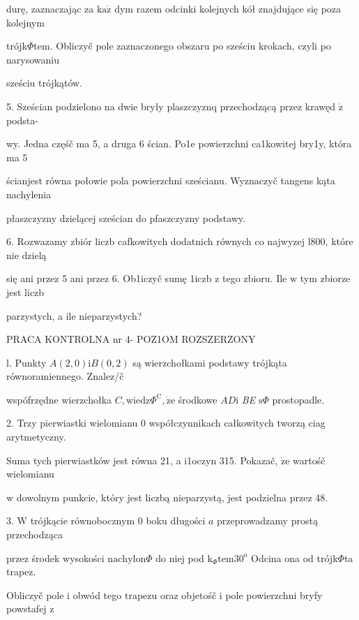 \documentclass[a4paper,12pt]{article}
\begin{document}
durę, zaznaczając za $\mathrm{k}\mathrm{a}\dot{\mathrm{z}}$ dym razem odcinki kolejnych kół znajdujące się poza kolejnym

trójk$\Phi$tem. Obliczyč pole zaznaczonego obszaru po sześciu krokach, czyli po narysowaniu

sześciu trójkątów.

5. Sześcian podzielono na dwie bryły plaszczyznq przechodzącą przez krawęd $\acute{\mathrm{z}}$ podsta-

wy. Jedna częśč ma 5, a druga 6 ścian. Po1e powierzchni ca1kowitej bry1y, która ma 5

ścianjest równa połowie pola powierzchni sześcianu. Wyznaczyč tangens kąta nachylenia

płaszczyzny dzielącej sześcian do pfaszczyzny podstawy.

6. Rozwazamy zbiór liczb cafkowitych dodatnich równych co najwyzej l800, które nie dzielą

się ani przez 5 ani przez 6. Ob1iczyč sumę 1iczb $\mathrm{z}$ tego zbioru. Ile $\mathrm{w}$ tym zbiorze jest liczb

parzystych, a ile nieparzystych?




PRACA KONTROLNA nr 4- POZ1OM ROZSZERZONY

l. Punkty $A(2,0)\mathrm{i}B(0,2)$ są wierzchołkami podstawy trójkąta równoramiennego. Znalez/č

wspófrzędne wierzchołka $C, \mathrm{w}\mathrm{i}\mathrm{e}\mathrm{d}\mathrm{z}\Phi^{\mathrm{C}}, \dot{\mathrm{z}}\mathrm{e}$ środkowe $AD\mathrm{i}$ {\it BE} $\mathrm{s}\Phi$ prostopadle.

2. Trzy pierwiastki wielomianu $0$ współczynnikach całkowitych tworzą ciag arytmetyczny.

Suma tych pierwiastków jest równa 21, a i1oczyn 315. Pokazač, $\dot{\mathrm{z}}\mathrm{e}$ wartośč wielomianu

$\mathrm{w}$ dowolnym punkcie, który jest liczbą nieparzystą, jest podzielna przez 48.

3. $\mathrm{W}$ trójkącie równobocznym $0$ boku długości $a$ przeprowadzamy prostą przechodząca

przez środek wysokości $\mathrm{n}\mathrm{a}\mathrm{c}\mathrm{h}\mathrm{y}\mathrm{l}\mathrm{o}\mathrm{n}\Phi$ do niej pod $\mathrm{k}_{\Phi}\mathrm{t}\mathrm{e}\mathrm{m}30^{\mathrm{o}}$ Odcina ona od trójk$\Phi$ta trapez.

Obliczyč pole $\mathrm{i}$ obwód tego trapezu oraz objetośč $\mathrm{i}$ pole powierzchni bryfy powstafej $\mathrm{z}$
\end{document}
